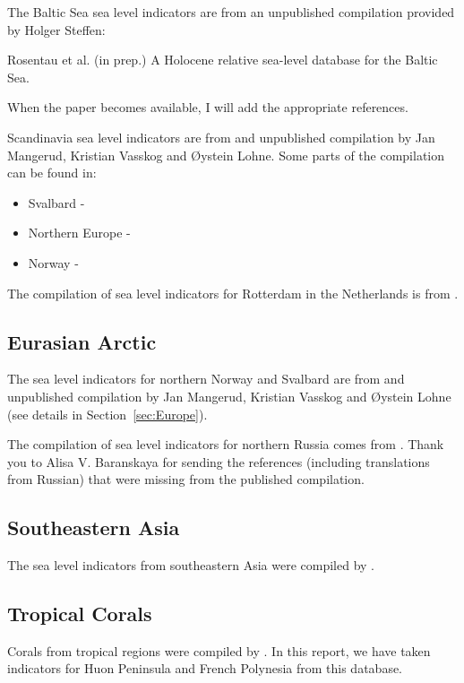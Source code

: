 \label{sec:Europe}

The Baltic Sea sea level indicators are from an unpublished compilation provided by Holger Steffen:

Rosentau et al. (in prep.) A Holocene relative sea-level database for the Baltic Sea.

When the paper becomes available, I will add the appropriate references.

Scandinavia sea level indicators are from and unpublished compilation by Jan Mangerud, Kristian Vasskog and \O{}ystein Lohne. Some parts of the compilation can be found in:

\begin{itemize}
  \item Svalbard - \citet{BondevikEtal1995}
  \item Northern Europe - \citet{FormanEtal2004}
  \item Norway - \citet{LohneEtal2007,RomundsetEtal2010,RomundsetEtal2011,RomundsetEtal2015,RomundsetEtal2018,VasskogEtal2019}
\end{itemize}

The compilation of sea level indicators for Rotterdam in the Netherlands is from \citet{HijmaCohen2019}.


\subsection{Eurasian Arctic}

The sea level indicators for northern Norway and Svalbard are from and unpublished compilation by Jan Mangerud, Kristian Vasskog and \O{}ystein Lohne (see details in Section~\ref{sec:Europe}).

The compilation of sea level indicators for northern Russia comes from \citet{BaranskayaEtal2018}. Thank you to Alisa V. Baranskaya for sending the references (including translations from Russian) that were missing from the published compilation.

\subsection{Southeastern Asia}

The sea level indicators from southeastern Asia were compiled by \citet{MannEtal2019}.

\subsection{Tropical Corals}

Corals from tropical regions were compiled by \citet{HibbertEtal2016}. In this report, we have taken indicators for Huon Peninsula and French Polynesia from this database.

